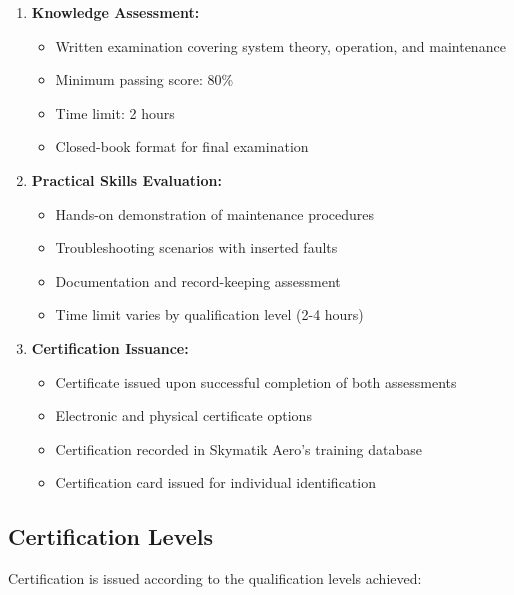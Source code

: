 \documentclass[12pt,a4paper,twoside,openright]{book}
\begin{document}
\begin{enumerate}
    \item \textbf{Knowledge Assessment:}
    \begin{itemize}
        \item Written examination covering system theory, operation, and maintenance
        \item Minimum passing score: 80\%
        \item Time limit: 2 hours
        \item Closed-book format for final examination
    \end{itemize}
    
    \item \textbf{Practical Skills Evaluation:}
    \begin{itemize}
        \item Hands-on demonstration of maintenance procedures
        \item Troubleshooting scenarios with inserted faults
        \item Documentation and record-keeping assessment
        \item Time limit varies by qualification level (2-4 hours)
    \end{itemize}
    
    \item \textbf{Certification Issuance:}
    \begin{itemize}
        \item Certificate issued upon successful completion of both assessments
        \item Electronic and physical certificate options
        \item Certification recorded in Skymatik Aero's training database
        \item Certification card issued for individual identification
    \end{itemize}
\end{enumerate}

\subsection{Certification Levels}

Certification is issued according to the qualification levels achieved:
\end{document}

